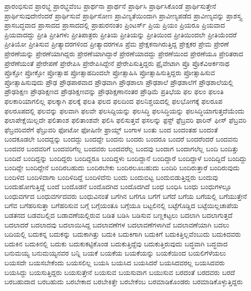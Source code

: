 {ಪ್ರಾರಂಭಿಸುವ
ಪ್ರಾರಭ್ಧ
ಪ್ರಾರಭ್ಧವೆಂಬ
ಪ್ರಾರ್ಥನಾ
ಪ್ರಾರ್ಥನೆ
ಪ್ರಾರ್ಥಿಸಿ
ಪ್ರಾರ್ಥಿಸಿಕೊಂಡೆ
ಪ್ರಾರ್ಥಿಸುತ್ತೇನೆ
ಪ್ರಾರ್ಥಿಸುವುದೇನೆಂದರೆ
ಪ್ರಾರ್ಥಿಸುವೆ
ಪ್ರಾರ್ಥಿಸೋಣ
ಪ್ರಾವಿಣ್ಯತೆಯಿಂದಾಗಿ
ಪ್ರಾವೀಣ್ಯಪಡೆದ
ಪ್ರಾವೀಣ್ಯವನ್ನು
ಪ್ರಾಶಸ್ತ್ಯ
ಪ್ರಾಸಬದ್ಧವಾದ
ಪ್ರಾಸಾದದ
ಪ್ರಾಸಾದದಲ್ಲಿ
ಪ್ರಾಹುರನಂತಂ
ಪ್ರಿಂಟರ್ಸ್
ಪ್ರಿಯ
ಪ್ರಿಯಂ
ಪ್ರಿಯರೂ
ಪ್ರಿಯವಾದ
ಪ್ರಿಯವಾದದ್ದು
ಪ್ರೀತಿ
ಪ್ರೀತಿಗಳು
ಪ್ರೀತಿಪಾತ್ರರು
ಪ್ರೀತಿಯ
ಪ್ರೀತಿಯನ್ನು
ಪ್ರೀತಿಯಿಂದ
ಪ್ರೀತಿಯಿಂದಲೇ
ಪ್ರೀತಿಯೆಂದರೆ
ಪ್ರೀತಿಯೋ
ಪ್ರೀತಿಸುವ
ಪ್ರೀತ್ಯಾದರಗಳಿಂದ
ಪ್ರೀತ್ಯಾದರಗಳೂ
ಪ್ರೆಮ
ಪ್ರೇಕ್ಷಕನಾಗಿರುತ್ತಿದ್ದ
ಪ್ರೇಕ್ಷಕರ
ಪ್ರೇಮ
ಪ್ರೇರಣೆ
ಪ್ರೇರಣೆಯನ್ನು
ಪ್ರೇರಣೆಯಾಗಿದ್ದರು
ಪ್ರೇರಣೆಯಾಗಿದ್ದಾರೆ
ಪ್ರೇರಣೆಯಾದದ್ದು
ಪ್ರೇರಣೆಯಿಂದ
ಪ್ರೇರಣೆಯೂ
ಪ್ರೇರಿತರಾದ
ಪ್ರೇರೆಣೆಯಂತೆ
ಪ್ರೇರೇಪಣೆ
ಪ್ರೇರೇಪಿಸಿ
ಪ್ರೇರೇಪಿಸಿದ್ದೇನೆ
ಪ್ರೇರೇಪಿಸುತ್ತಿದ್ದರು
ಪ್ರೈವೇಟಾಗಿ
ಪ್ರೊ
ಪ್ರೊಕೆವಿಅರ್ಕನಾಥ
ಪ್ರೊಕ್ತೋ
ಪ್ರೋಕ್ತೋ
ಪ್ರೋತ್ಸಾಹ
ಪ್ರೋತ್ಸಾಹದಿಂದಲೇ
ಪ್ರೋತ್ಸಾಹಿಸಿ
ಪ್ರೋತ್ಸಾಹಿಸುತ್ತಿದ್ದರು
ಪ್ರೋತ್ಸಾಹಿಸುವ
ಪ್ರೋತ್ಸಾಹಿಸುವುದು
ಪ್ರೌಢ
ಪ್ರೌಢಪಾಠವಾದ
ಪ್ರೌಢವಾಗಿ
ಪ್ರೌಢಶಾಲಾ
ಪ್ರೌಢಶಾಲೆ
ಪ್ರೌಢಶಾಲೆಗೆ
ಪ್ರೌಢಶಾಲೆಯಲ್ಲಿ
ಪ್ರೌಢಶಿಕ್ಷಣ
ಪ್ರೌಢಶಿಕ್ಷಣದ
ಪ್ರೌಢಶಿಕ್ಷಣವನ್ನು
ಪ್ರೌಢಶಿಕ್ಷಣಾನಂತರ
ಪ್ರೌಢಿಮೆ
ಪ್ರತಿಭೆಯ
ಫಲ
ಫಲಂ
ಫಲಂತಿ
ಫಲಕಾರಿಯಾಗಲಿಲ್ಲ
ಫಲಕ್ಕಾಗಿ
ಫಲಕ್ಕೆ
ಫಲತಿ
ಫಲದ
ಫಲದಿಂದ
ಫಲನಿಶ್ಚಯದಲ್ಲಿ
ಫಲಭೋಗಕ್ಕೆ
ಫಲರೂಪ
ಫಲರೂಪದಲ್ಲಿ
ಫಲವನ್ನು
ಫಲವಾಗಿ
ಫಲವೇ
ಫಲಸಿದ್ದಿಯನ್ನು
ಫಲಸಿದ್ಧಿ
ಫಲಸಿದ್ಧಿಯನ್ನು
ಫಲಸಿದ್ಧಿಯಾಗುತ್ತದೆಯೆಂದು
ಫಲಾಪೇಕ್ಷೆಯಿಲ್ಲದೇ
ಫಲಿತಾಂಶ
ಫಲಿತಾಂಶವೇ
ಫಲಿಸಿ
ಫಲಿಸುತ್ತವೆ
ಫಸಲನ್ನು
ಫ಼ಸ್ಟ್
ಫ಼ೆಬ್ರವರಿ
ಫಾರಿನ್
ಫೀಸ್
ಫೆಬ್ರವರಿ
ಫೆಬ್ರವರಿವರೆಗೆ
ಫೆಬ್ರುವರಿ
ಫೋಟೋ
ಫೋಷಿಣೀ
ಫ್ರಾಯ್ಡ್
ಬಂಗಾಳ
ಬಂತು
ಬಂದ
ಬಂದಂತಹ
ಬಂದಂತೆ
ಬಂದಕೂಡಲೇ
ಬಂದದ್ದನ್ನು
ಬಂದದ್ದು
ಬಂದದ್ದೇ
ಬಂದನು
ಬಂದರು
ಬಂದರೂ
ಬಂದರೆ
ಬಂದರೆಂದರೆ
ಬಂದವನು
ಬಂದವರ
ಬಂದವರಿಗೆ
ಬಂದವರಿಗೆಲ್ಲ
ಬಂದವರು
ಬಂದವರೆಲ್ಲ
ಬಂದವು
ಬಂದಾಗ
ಬಂದಾಗಲೆಲ್ಲ
ಬಂದಿ
ಬಂದಿತ್ತು
ಬಂದಿದೆ
ಬಂದಿದ್ದನ್ನು
ಬಂದಿದ್ದರು
ಬಂದಿದ್ದರೂ
ಬಂದಿದ್ದಳು
ಬಂದಿದ್ದಾನೆ
ಬಂದಿದ್ದಾರೆ
ಬಂದಿದ್ದಾಳೆ
ಬಂದಿದ್ದಿದೆ
ಬಂದಿದ್ದು
ಬಂದಿದ್ದೇ
ಬಂದಿದ್ದೇನೆ
ಬಂದಿರಬಹುದು
ಬಂದಿರಬೇಕು
ಬಂದಿರಲೂಬಹುದು
ಬಂದಿರಿ
ಬಂದಿರುತ್ತಾರೆ
ಬಂದಿರುವುದು
ಬಂದಿಳಿದ
ಬಂದಿಳಿದಾಗಾ
ಬಂದಿಳಿದಿದ್ದೆ
ಬಂದಿಳಿದೆನು
ಬಂದು
ಬಂದುಬಿಟ್ಟ
ಬಂದುಬಿಡುತ್ತಿದ್ದರು
ಬಂದುವು
ಬಂದುಹೋಗುತ್ತಿದ್ದೆ
ಬಂದೆ
ಬಂದೊಡನೆ
ಬಂದೊದಗಿದ
ಬಂದೊದಗಿದೆ
ಬಂಧ
ಬಂಧಿಸಿ
ಬಂಧು
ಬಂಧುಗಳಲ್ಲೂ
ಬಂಧುವರ್ಗದ
ಬಂಧುವರ್ಗದವರು
ಬಂಧುವಿನಂತೆ
ಬಗೆಗಿನ
ಬಗೆಗೂ
ಬಗೆಗೆ
ಬಗೆದೆ
ಬಗೆಯ
ಬಗೆಯಲ್ಲಿ
ಬಗೆಯುತ್ತೇನೆ
ಬಗೆವ
ಬಗೆಹರಿಸುತ್ತಾ
ಬಗೆಹರಿಸುವ
ಬಗ್ಗೆ
ಬಗ್ಗೆಯಂತೂ
ಬಗ್ಗೆಯೂ
ಬಟ್ಟಲಿನಲ್ಲಿ
ಬಟ್ಟೆಗೊಡ್ಡಿದ
ಬಟ್ಟೆಯಿಲ್ಲಚಾಪೆಯ
ಬಡತನದ
ಬಡವಬಲ್ಲಿದ
ಬಡಾವಣೆಯಲ್ಲಿರುವ
ಬಡಿತ
ಬಡಿಸಿ
ಬಡಿಸುವ
ಬಣ್ಣಕಟ್ಟಲು
ಬದಲಾಗಿ
ಬದಲಾಗುತ್ತದೆ
ಬದಲಾದರೆ
ಬದಲಾದವು
ಬದಲಾಯಿಸಿದ್ದ
ಬದಲಾವಣೆಗಳ
ಬದಲಾವಣೆಗಳಾಗಿವೆ
ಬದಲಾವಣೆಯಾಗಿ
ಬದಲು
ಬದಿಯಲ್ಲಿ
ಬದುಕನ್ನ
ಬದುಕನ್ನು
ಬದುಕಾಗಿತ್ತು
ಬದುಕಿ
ಬದುಕಿಗಾಗಿ
ಬದುಕಿಗೆ
ಬದುಕಿತ್ತಿಲ್ಲವೆಂಬುದು
ಬದುಕಿದವರು
ಬದುಕಿನ
ಬದುಕಿನಲ್ಲಿ
ಬದುಕು
ಬದುಕುಕಟ್ಟಿಕೊಂಡ
ಬದುಕುತ್ತಿದ್ದೆವು
ಬದುಕುತ್ತಿರುವುದು
ಬದ್ಧವಾಗಿ
ಬದ್ಧವಾದ
ಬನುಮಯ್ಯ
ಬನುಮಯ್ಯನವರ
ಬನ್ನಿ
ಬಯಕೆ
ಬಯಕೆಯ
ಬಯಕೆಯನ್ನು
ಬಯಕೆಯಿಂದ
ಬಯಲಿಗೆಳೆಯಲು
ಬಯಸದೇ
ಬಯಸಬೇಕೆಂದು
ಬಯಸಲಿಲ್ಲ
ಬಯಸಿ
ಬಯಸಿದ
ಬಯಸಿದರೆ
ಬಯಸಿದವರಲ್ಲ
ಬಯಸಿದವರು
ಬಯಸಿದ್ದು
ಬಯಸುತ್ತಿದ್ದರು
ಬಯಸುತ್ತೇನೆ
ಬಯಸುವ
ಬಯಸುವಾಗ
ಬಯುಸುವ
ಬರದಂತೆ
ಬರದವರು
ಬರದೆ
ಬರಬಹುದಾದ
ಬರಬಹುದು
ಬರಬೇಕಾದ
ಬರಬೇಕಿತ್ತೇ
ಬರಬೇಕೆಂಬ
ಬರಮಾಡಿಕೊಂಡರು
ಬರಮಾಡಿಕೊಳ್ಳುತ್ತಿದ್ದರು
}
